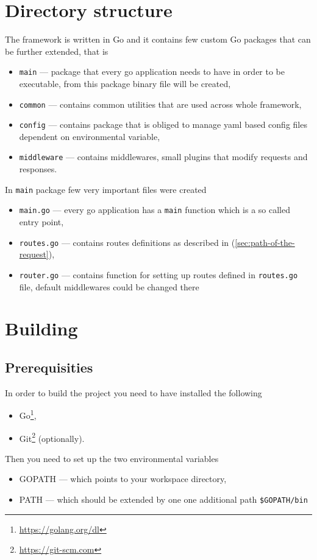 \section{Directory structure}
The framework is written in Go and it contains few custom Go
packages\cite{Packages-go} that can be further extended, that is
\begin{itemize}
\item \verb|main| --- package that every go application needs to have in order
  to be executable, from this package binary file will be
  created\cite{Packages-go},
\item \verb|common| --- contains common utilities that are used across whole
  framework,
\item \verb|config| --- contains package that is obliged to manage yaml based
  config files dependent on environmental variable,
\item \verb|middleware| --- contains middlewares, small plugins that modify
  requests and responses.
\end{itemize}

In \verb|main| package few very important files were created
\begin{itemize}
\item \verb|main.go| --- every go application has a \verb|main| function which
  is a so called entry point,
\item \verb|routes.go| --- contains routes definitions as described in
  (\ref{sec:path-of-the-request}),
\item \verb|router.go| --- contains function for setting up routes defined in
  \verb|routes.go| file, default middlewares could be changed there
\end{itemize}

\section{Building}

\subsection{Prerequisities}
In order to build the project you need to have installed the following
\begin{itemize}
\item Go\footnote{\url{https://golang.org/dl}},
\item Git\footnote{\label{git-src}\url{https://git-scm.com}} (optionally).
\end{itemize}
Then you need to set up the two environmental variables
\begin{itemize}
\item GOPATH\cite[The GOPATH environment variable]{Packages-go} --- which
  points to your workspace directory,
\item PATH --- which should be extended by one one additional path
  \verb|$GOPATH/bin|
\end{itemize}


